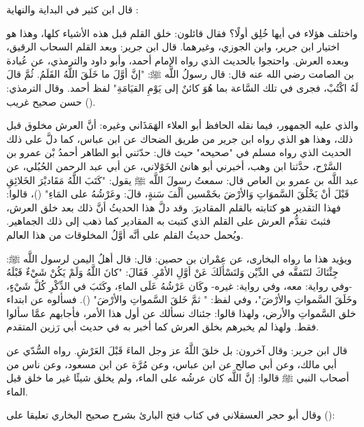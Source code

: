 قال ابن كثير في البداية والنهاية \href{https://shamela.ws/book/30097/106#p7}{\faExternalLink}:

واختلف هؤلاء في أيها خُلِق أولًا؟ فقال قائلون: خلق القلم قبل هذه الأشياء كلها، وهذا هو اختيار ابن جرير، وابن الجوزي، وغيرهما. قال ابن جرير: وبعد القلم السحاب الرقيق، وبعده العرش. واحتجوا بالحديث الذي رواه الإمام أحمد، وأبو داود والترمذي، عن عُبادة بن الصامت رضي الله عنه قال: قال رسولُ اللَّه ﷺ: "إنَّ أوَّلَ ما خَلَقَ اللَّهُ القَلَمُ. ثُمَّ قالَ لَهُ اكْتُبْ، فجرى في تلك السَّاعة بما هُوَ كائنٌ إلى يَوْمِ القيَامَةِ" لفظ أحمد. وقال الترمذي: حسن صحيح غريب ().

والذي عليه الجمهور، فيما نقله الحافظ أبو العلاء الهَمَذَاني وغيره: أنَّ العرش مخلوق قبل ذلك، وهذا هو الذي رواه ابن جرير من طريق الضحاك عن ابن عباس، كما دلَّ على ذلك الحديث الذي رواه مسلم في "صحيحه" حيث قال: حدّثني أبو الطاهر أحمدُ بْن عمرو بن السَّرْح، حدَّثنا ابن وهب، أخبرني أبو هانئ الخَوْلاني، عن أبي عبد الرحمن الحُبُلي، عن عبد اللَّه بن عمرو بن العاص قال: سمعتُ رسولَ اللَّه ﷺ يقول: "كَتَبَ اللَّهُ مَقَاديْرَ الخَلائِقِ قَبْلَ أنْ يَخْلُقَ السَّموَاتِ وَالأرْضَ بخَمْسين ألْفَ سَنةٍ، قالَ: وعَرْشُهُ على المَاءِ" ()، قالوا: فهذا التقدير هو كتابته بالقلم المقاديرَ. وقد دلَّ هذا الحديثُ أنَّ ذلك بعد خلق العرش، فثبتَ تقدُّم العرش على القلم الذي كتبت به المقادير كما ذهب إلى ذلك الجماهير. ويُحمل حديثُ القلم على أنَّه أوَّلُ المخلوقات من هذا العالم.

ويؤيد هذا ما رواه البخارى، عن عِمْران بن حصين: قال: قال أهلُ اليمن لرسول اللَّه ﷺ: جِئْنَاكَ لنَتَفقَّه في الدِّيْن وَلنَسْألَكَ عَنْ أوَّلِ الأمْرِ. فَقَالَ: "كانَ اللَّهُ وَلَمْ يَكُنْ شَيْءٌ قَبْلَهُ -وفي رواية: معه، وفي رواية: غيره- وكَان عَرْشُهُ عَلَى الماءِ، وكَتَبَ في الذِّكْرِ كُلَّ شَيْءٍ، وخَلَقَ السَّمواتِ والأرْضَ"، وفي لفظ: " ثمَّ خَلقَ السَّمواتِ والأرْضَ" (). فسألوه عن ابتداء خلق السَّمواتِ والأرض، ولهذا قالوا: جئناك نسألك عن أول هذا الأمر، فأجابهم عمَّا سألوا فقط. ولهذا لم يخبرهم بخلق العرش كما أخبر به في حديث أبي رَزين المتقدم.

قال ابن جرير: وقال آخرون: بل خلقَ اللَّهُ عز وجل الماءَ قَبْلَ العَرْشِ. رواه السُّدّي عن أبي مالك، وعن أبي صالح عن ابن عباس، وعن مُرَّة عن ابن مسعود، وعن ناس من أصحاب النبي ﷺ قالوا: إنَّ اللَّه كان عرشُه على الماء، ولم يخلق شيئًا غير ما خلق قبل الماء.

وقال أبو حجر العسقلاني في كتاب فتح البارئ بشرح صحيح البخاري \href{https://shamela.ws/book/1673/3483#p2}{\faExternalLink} تعليقا على (): 

